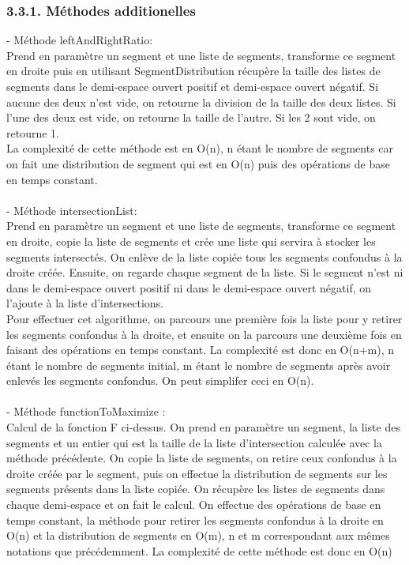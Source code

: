 \documentclass[a4paper,12pt]{report}	%
\begin{document}
    {\subsubsection*{3.3.1. Méthodes additionelles}}
    - Méthode leftAndRightRatio:\\
    \indent Prend en paramètre un segment et une liste de segments, transforme ce segment en droite puis en utilisant SegmentDistribution récupère la taille des listes de segments dans le demi-espace ouvert positif et demi-espace ouvert négatif. Si aucune des deux n'est vide, on retourne la division de la taille des deux listes. Si l'une des deux est vide, on retourne la taille de l'autre. Si les 2 sont vide, on retourne 1.\\
\indent La complexité de cette méthode est en O(n), n étant le nombre de segments car on fait une distribution de segment qui est en O(n) puis des opérations de base en temps constant.\\\\
\indent - Méthode intersectionList: \\
\indent Prend en paramètre un segment et une liste de segments, transforme ce segment en droite,  copie la liste de segments et crée une liste qui servira à stocker les segments intersectés. On enlève de la liste copiée tous les segments confondus à la droite créée. Ensuite, on regarde chaque segment de la liste. Si le segment n'est ni dans le demi-espace ouvert positif ni dans le demi-espace ouvert négatif, on l'ajoute à la liste d'intersections.\\
\indent Pour effectuer cet algorithme, on parcours une première fois la liste pour y retirer les segments confondus à la droite, et ensuite on la parcours une deuxième fois en faisant des opérations en temps constant.
La complexité est donc en O(n+m), n étant le nombre de segments initial, m étant le nombre de segments après avoir enlevés les segments confondus. On peut simplifer ceci en O(n).\\\\
\indent - Méthode functionToMaximize :\\
\indent Calcul de la fonction F ci-dessus. On prend en paramètre un segment, la liste des segments et un entier qui est la taille de la liste d'intersection calculée avec la méthode précédente. On copie la liste de segments, on retire ceux confondus à la droite créée par le segment, puis on effectue la distribution de segments sur les segments présents dans la liste copiée. On récupère les listes de segments dans chaque demi-espace et on fait le calcul. On effectue des opérations de base en temps constant, la méthode pour retirer les segments confondus à la droite en O(n) et la distribution de segments en O(m), n et m correspondant aux mêmes notations que précédemment. La complexité de cette méthode est donc en O(n)\\
\end{document}
